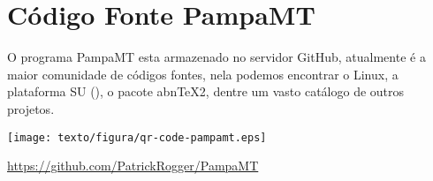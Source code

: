 \chapter{Código Fonte PampaMT}
    
    \vspace*{2cm} 
    
    O programa PampaMT esta armazenado no servidor GitHub, atualmente é a maior comunidade de códigos fontes, nela podemos encontrar o  Linux, a plataforma SU (), o pacote abn\TeX2, dentre um vasto catálogo de outros projetos.   
    
    \vspace*{1cm}
    
    \begin{figure*}[h]
        \begin{center}
            \texttt{[image: texto/figura/qr-code-pampamt.eps]}
        \end{center}
    \end{figure*}
    
    \begin{center}
        \url{https://github.com/PatrickRogger/PampaMT}
    \end{center}

    \vfill
